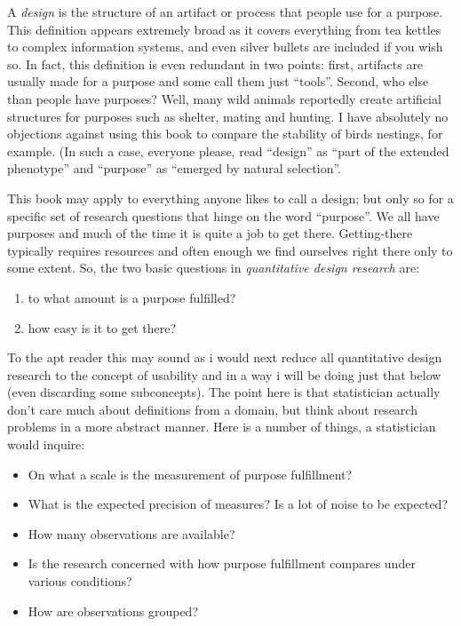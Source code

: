 \documentclass[]{svmono}
\providecommand{\tightlist}{%
  \setlength{\itemsep}{0pt}\setlength{\parskip}{0pt}}
\begin{document}
A \emph{design} is the structure of an artifact or process that people
use for a purpose. This definition appears extremely broad as it covers
everything from tea kettles to complex information systems, and even
silver bullets are included if you wish so. In fact, this definition is
even redundant in two points: first, artifacts are usually made for a
purpose and some call them just ``tools''. Second, who else than people
have purposes? Well, many wild animals reportedly create artificial
structures for purposes such as shelter, mating and hunting. I have
absolutely no objections against using this book to compare the
stability of birds nestings, for example. (In such a case, everyone
please, read ``design'' as ``part of the extended phenotype'' and
``purpose'' as ``emerged by natural selection''.

This book may apply to everything anyone likes to call a design; but
only so for a specific set of research questions that hinge on the word
``purpose''. We all have purposes and much of the time it is quite a job
to get there. Getting-there typically requires resources and often
enough we find ourselves right there only to some extent. So, the two
basic questions in \emph{quantitative design research} are:

\begin{enumerate}
\def\labelenumi{\arabic{enumi}.}
\tightlist
\item
  to what amount is a purpose fulfilled?
\item
  how easy is it to get there?
\end{enumerate}

To the apt reader this may sound as i would next reduce all quantitative
design research to the concept of usability and in a way i will be doing
just that below (even discarding some subconcepts). The point here is
that statistician actually don't care much about definitions from a
domain, but think about research problems in a more abstract manner.
Here is a number of things, a statistician would inquire:

\begin{itemize}
\tightlist
\item
  On what a scale is the measurement of purpose fulfillment?
\item
  What is the expected precision of measures? Is a lot of noise to be
  expected?
\item
  How many observations are available?
\item
  Is the research concerned with how purpose fulfillment compares under
  various conditions?
\item
  How are observations grouped?
\end{itemize}
\end{document}
